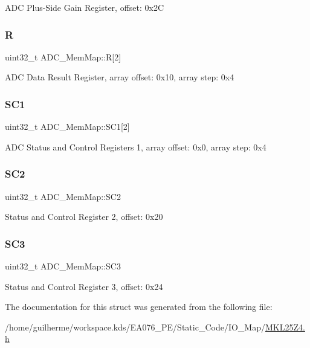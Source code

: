 A\+DC Plus-\/\+Side Gain Register, offset\+: 0x2C \mbox{\label{struct_a_d_c___mem_map_acbd8ded0e3f30d8502e9b9229e092fe8}} 
\subsubsection{\texorpdfstring{R}{R}}
{\footnotesize\ttfamily uint32\+\_\+t A\+D\+C\+\_\+\+Mem\+Map\+::R\mbox{[}2\mbox{]}}

A\+DC Data Result Register, array offset\+: 0x10, array step\+: 0x4 \mbox{\label{struct_a_d_c___mem_map_ab3900b4bfe889cd9d04850d121394741}} 
\subsubsection{\texorpdfstring{S\+C1}{SC1}}
{\footnotesize\ttfamily uint32\+\_\+t A\+D\+C\+\_\+\+Mem\+Map\+::\+S\+C1\mbox{[}2\mbox{]}}

A\+DC Status and Control Registers 1, array offset\+: 0x0, array step\+: 0x4 \mbox{\label{struct_a_d_c___mem_map_ad7caff2bf5e2dfb2159d174af24dc693}} 
\subsubsection{\texorpdfstring{S\+C2}{SC2}}
{\footnotesize\ttfamily uint32\+\_\+t A\+D\+C\+\_\+\+Mem\+Map\+::\+S\+C2}

Status and Control Register 2, offset\+: 0x20 \mbox{\label{struct_a_d_c___mem_map_a68295218c104f78bc2b11f04c06ce55e}} 
\subsubsection{\texorpdfstring{S\+C3}{SC3}}
{\footnotesize\ttfamily uint32\+\_\+t A\+D\+C\+\_\+\+Mem\+Map\+::\+S\+C3}

Status and Control Register 3, offset\+: 0x24 

The documentation for this struct was generated from the following file\+:\begin{DoxyCompactItemize}
\item 
/home/guilherme/workspace.\+kds/\+E\+A076\+\_\+\+P\+E/\+Static\+\_\+\+Code/\+I\+O\+\_\+\+Map/\hyperlink{_m_k_l25_z4_8h}{M\+K\+L25\+Z4.\+h}\end{DoxyCompactItemize}
